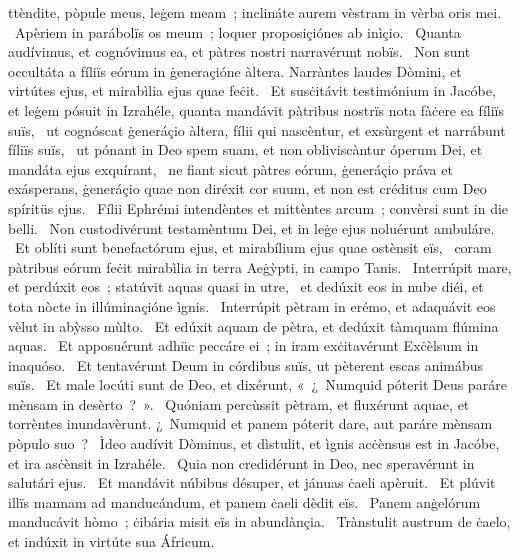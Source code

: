 \psalmChapterWithInscription{}
{ }
{%
ttèndite, pòpule meus, leġem meam~; inclináte aurem vèstram in vèrba oris mei. 
~Apèriem in parábolïs os meum~; loquer proposiçiónes ab inìçio. 
~Quanta audívimus, et cognóvimus ea, et pàtres nostri narravérunt nobïs. 
~Non sunt occultáta a fíliïs eórum in ġeneraçióne àltera. Narràntes laudes Dòmini, et virtútes ejus, et mirabìlia ejus quae feċit. 
~Et susċitávit testimónium in Jacóbe, et leġem pósuit in Izrahéle, quanta mandávit pàtribus nostrïs nota fàċere ea fíliïs suïs, 
~ut cognóscat ġeneráçio àltera, fílii qui nascèntur, et exsùrgent et narrábunt fíliïs suïs, 
~ut pónant in Deo spem suam, et non obliviscàntur óperum Dei, et mandáta ejus exquírant, 
~ne fiant sicut pàtres eórum, ġeneráçio práva et exásperans, ġeneráçio quae non diréxit cor suum, et non est créditus cum Deo spíritüs ejus. 
~Fílii Ephrémi intendèntes et mittèntes arcum~; convèrsi sunt in die belli. 
~Non custodivérunt testamèntum Dei, et in leġe ejus noluérunt ambuláre. 
~Et oblíti sunt benefactórum ejus, et mirabílium ejus quae ostènsit eïs, 
~coram pàtribus eórum feċit mirabìlia in terra Aeġỳpti, in campo Tanis. 
~Interrúpit mare, et perdúxit eos~; statúvit aquas quasi in utre, 
~et dedúxit eos in nube diéi, et tota nòcte in illúminaçióne ìgnis. 
~Interrúpit pètram in erémo, et adaquávit eos vèlut in abỳsso mùlto. 
~Et edúxit aquam de pètra, et dedúxit tàmquam flúmina aquas. 
~Et apposuérunt adhüc peccáre ei~; in iram exċitavérunt Exċèlsum in inaquóso. 
~Et tentavérunt Deum in córdibus suïs, ut pèterent escas animábus suïs. 
~Et male locúti sunt de Deo, et dixérunt, «~¿~Numquid póterit Deus paráre mènsam in desèrto~?~». 
~Quóniam percùssit pètram, et fluxérunt aquae, et torrèntes inundavèrunt. ¿~Numquid et panem póterit dare, aut paráre mènsam pòpulo suo~? 
~Ìdeo audívit Dòminus, et dìstulit, et ìgnis acċènsus est in Jacóbe, et ira asċènsit in Izrahéle. 
~Quia non credidérunt in Deo, nec speravérunt in salutári ejus. 
~Et mandávit núbibus désuper, et jánuas ċaeli apèruit. 
~Et plúvit illïs mannam ad manducándum, et panem ċaeli dèdit eïs. 
~Panem anġelórum manducávit hòmo~; ċibária misit eïs in abundànçia. 
~Trànstulit austrum de ċaelo, et indúxit in virtúte sua Áfricum. 
}
